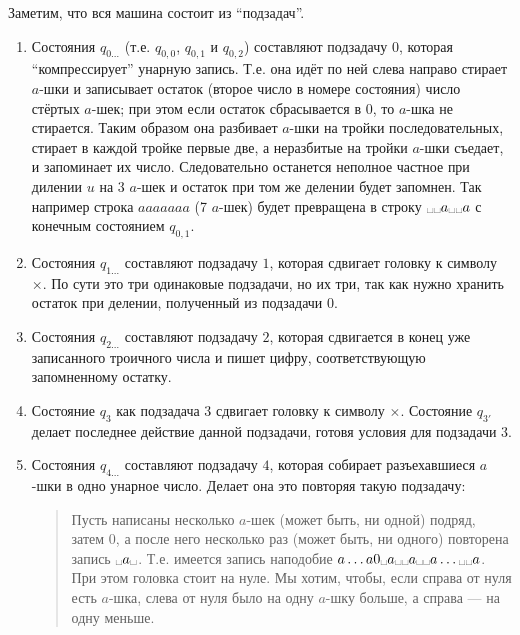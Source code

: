 \documentclass[12pt,a4paper]{article}
\newcommand{\spacesymbol}{\ensuremath{\text{\textvisiblespace}}}
\begin{document}
\begin{enumproblem}
        Заметим, что вся машина состоит из ``подзадач''.
        \begin{enumerate}
            \item Состояния $q_{0\dots}$ (т.е. $q_{0, 0}$, $q_{0, 1}$ и $q_{0, 2}$) составляют подзадачу $0$, которая ``компрессирует'' унарную запись. Т.е. она идёт по ней слева направо стирает $a$-шки и записывает остаток (второе число в номере состояния) число стёртых $a$-шек; при этом если остаток сбрасывается в $0$, то $a$-шка не стирается. Таким образом она разбивает $a$-шки на тройки последовательных, стирает в каждой тройке первые две, а неразбитые на тройки $a$-шки съедает, и запоминает их число. Следовательно останется неполное частное при дилении $u$ на $3$ $a$-шек и остаток при том же делении будет запомнен. Так например строка $aaaaaaa$ (7 $a$-шек) будет превращена в строку $\spacesymbol\spacesymbol a\spacesymbol\spacesymbol a$ с конечным состоянием $q_{0, 1}$.
            \item Состояния $q_{1\dots}$ составляют подзадачу $1$, которая сдвигает головку к символу $\times$. По сути это три одинаковые подзадачи, но их три, так как нужно хранить остаток при делении, полученный из подзадачи $0$.
            \item Состояния $q_{2\dots}$ составляют подзадачу $2$, которая сдвигается в конец уже записанного троичного числа и пишет цифру, соответствующую запомненному остатку.
            \item Состояние $q_3$ как подзадача $3$ сдвигает головку к символу $\times$. Состояние $q_{3'}$ делает последнее действие данной подзадачи, готовя условия для подзадачи $3$.
            \item Состояния $q_{4\dots}$ составляют подзадачу $4$, которая собирает разъехавшиеся $a$-шки в одно унарное число. Делает она это повторяя такую подзадачу:
                \begin{quotation}
                    Пусть написаны несколько $a$-шек (может быть, ни одной) подряд, затем $0$, а после него несколько раз (может быть, ни одного) повторена запись $\spacesymbol a \spacesymbol$. Т.е. имеется запись наподобие $a\dots a0\spacesymbol a\spacesymbol \spacesymbol a \spacesymbol \spacesymbol a \dots \spacesymbol \spacesymbol a$. При этом головка стоит на нуле. Мы хотим, чтобы, если справа от нуля есть $a$-шка, слева от нуля было на одну $a$-шку больше, а справа --- на одну меньше.
                \end{quotation}

\end{enumerate}
\end{enumproblem}
\end{document}
